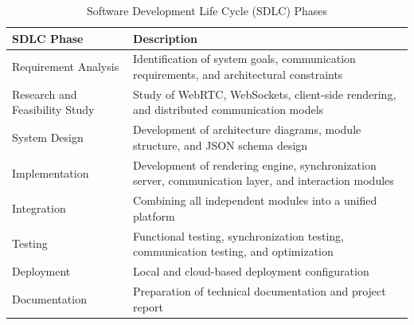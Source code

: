 \documentclass[12pt]{article}
\begin{document}
\begin{table}[h!]
\centering
\renewcommand{\arraystretch}{1.5}
\begin{tabular}{|p{5cm}|p{9cm}|}
\hline
\textbf{SDLC Phase} & \textbf{Description} \\ 
\hline

Requirement Analysis & Identification of system goals, communication requirements, and architectural constraints \\ 
\hline

Research and Feasibility Study & Study of WebRTC, WebSockets, client-side rendering, and distributed communication models \\ 
\hline

System Design & Development of architecture diagrams, module structure, and JSON schema design \\ 
\hline

Implementation & Development of rendering engine, synchronization server, communication layer, and interaction modules \\ 
\hline

Integration & Combining all independent modules into a unified platform \\ 
\hline

Testing & Functional testing, synchronization testing, communication testing, and optimization \\ 
\hline

Deployment & Local and cloud-based deployment configuration \\ 
\hline

Documentation & Preparation of technical documentation and project report \\ 
\hline

\end{tabular}
\caption{Software Development Life Cycle (SDLC) Phases}

\end{table}
\end{document}
